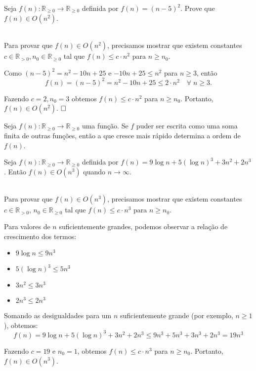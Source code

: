 \begin{exmp}
Seja $f(n):\mathbb{R}_{\geq 0}\rightarrow \mathbb{R}_{\geq 0}$ definida por $f(n)=(n-5)^2$. Prove que $f(n)\in O(n^2)$. 
\vspace{0.2cm}

 \\

Para provar que $f(n)\in O(n^2)$, precisamos mostrar que existem constantes $c\in \mathbb{R}_{>0},n_0 \in \mathbb{R}_{\geq 0}$ tal que $f(n) \leq c\cdot n^2$ para $n\geq n_0$.\vspace{0.3cm}

Como $(n-5)^2=n^2 -10n +25$ e $-10n + 25 \leq n^2$ para $n\geq 3$, então
$$
f(n)=(n-5)^2=n^2 -10n +25 \leq 2\cdot n^2 \quad \forall\; n\geq 3.
$$ 

Fazendo $c=2,n_0 =3$ obtemos $f(n)\leq c\cdot n^2$ 
 para $n\geq n_0$.  Portanto, $f(n)\in O(n^2)$.  
$\hfill\Box$
\end{exmp}

\begin{property}
Seja $f(n):\mathbb{R}_{\geq 0}\rightarrow \mathbb{R}_{\geq 0}$ uma função. Se $f$ puder ser escrita como uma soma finita de outras funções, então a que cresce mais rápido determina a ordem de $f(n)$. 
\end{property}\vspace{0.2cm}

\begin{exmp}
Seja $f(n):\mathbb{R}_{\geq 0}\rightarrow \mathbb{R}_{\geq 0}$ definida por $f(n)=9\log n + 5(\log n)^3 +3n^2 + 2n^3$. Então $f(n)\in O(n^3)$ quando $n\rightarrow \infty$.    
\vspace{0.2cm}

 \\

Para provar que $f(n)\in O(n^{3})$, precisamos mostrar que existem constantes $c\in\mathbb{R}_{>0}$, $n_{0}\in\mathbb{R}_{\ge0}$ tal que $f(n)\le c\cdot n^{3}$ para $n\ge n_{0}$.

Para valores de $n$ suficientemente grandes, podemos observar a relação de crescimento dos termos:
\begin{itemize}
    \item $9\log n \le 9n^{3}$
    \item $5(\log n)^{3} \le 5n^{3}$
    \item $3n^{2} \le 3n^{3}$
    \item $2n^{3} \le 2n^{3}$
\end{itemize}

Somando as desigualdades para um $n$ suficientemente grande (por exemplo, $n \ge 1$), obtemos:
$$
f(n) = 9\log n+5(\log n)^{3}+3n^{2}+2n^{3} \le 9n^{3} + 5n^{3} + 3n^{3} + 2n^{3} = 19n^{3}
$$

Fazendo $c=19$ e $n_{0}=1$, obtemos $f(n)\le c\cdot n^{3}$ para $n\ge n_{0}$. Portanto, $f(n)\in O(n^{3})$.
\end{exmp}

